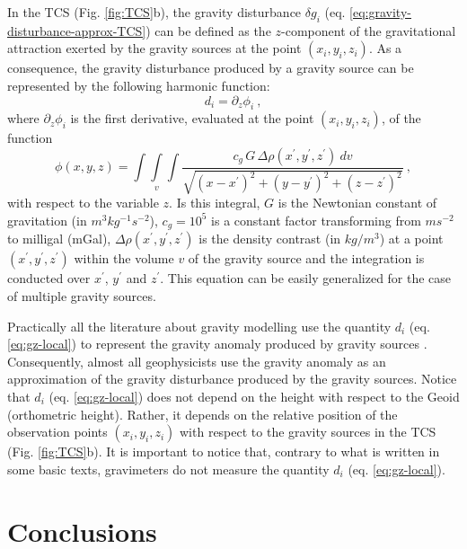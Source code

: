 \documentclass[extra]{gji}
\begin{document}
In the TCS (Fig. \ref{fig:TCS}b),
the gravity disturbance $\delta g_{i}$ (eq. \ref{eq:gravity-disturbance-approx-TCS})
can be defined as the $z$-component of the gravitational attraction exerted by
the gravity sources at the point $(x_{i}, y_{i}, z_{i})$.
As a consequence, the gravity disturbance produced by
a gravity source can be represented by the following harmonic function:
\begin{equation}
d_{i} = \partial_{z} \phi_{i} \: ,
\label{eq:gz-local}
\end{equation}
where $\partial_{z} \phi_{i}$ is the first 
derivative, evaluated at the point $(x_{i},y_{i},z_{i})$, of the function 
\begin{equation}
\phi(x,y,z) = \int\int\limits_{v}\int 
\frac{c_{g} \, G \, \Delta\rho(x^{\prime}, y^{\prime}, z^{\prime}) \: dv}
{\sqrt{(x - x^{\prime})^{2} + 
(y - y^{\prime})^{2} + (z - z^{\prime})^{2}}} \: ,
\label{eq:phi}
\end{equation}
with respect to the variable $z$. Is this integral, 
$G$ is the Newtonian constant of gravitation (in $m^{3} kg^{-1} s^{-2}$),
$c_{g} = 10^{5}$ is a constant factor transforming from $m s^{-2}$ 
to milligal (mGal), $\Delta\rho(x^{\prime}, y^{\prime}, z^{\prime})$
is the density contrast (in $kg / m^{3}$) at a point 
$(x^{\prime}, y^{\prime}, z^{\prime})$ within 
the volume $v$ of the gravity source and the integration is conducted 
over $x^{\prime}$, $y^{\prime}$ and $z^{\prime}$.
This equation can be easily generalized for the case
of multiple gravity sources.

Practically all the literature about gravity modelling
use the quantity $d_{i}$ (eq. \ref{eq:gz-local})
to represent the gravity anomaly produced by 
gravity sources \citep[e.g.,][]{blakely1996}. 
Consequently, almost all geophysicists use the gravity
anomaly as an approximation of the gravity disturbance
produced by the gravity sources. Notice that $d_{i}$ 
(eq. \ref{eq:gz-local}) does not depend on the
height with respect to the Geoid (orthometric height). 
Rather, it depends on the relative position 
of the observation points $(x_{i}, y_{i}, z_{i})$ with respect to
the gravity sources in the TCS (Fig. \ref{fig:TCS}b).
It is important to notice that, contrary to what is written in 
some basic texts, gravimeters do not measure the quantity
$d_{i}$ (eq. \ref{eq:gz-local}).


\section{Conclusions}
\end{document}

